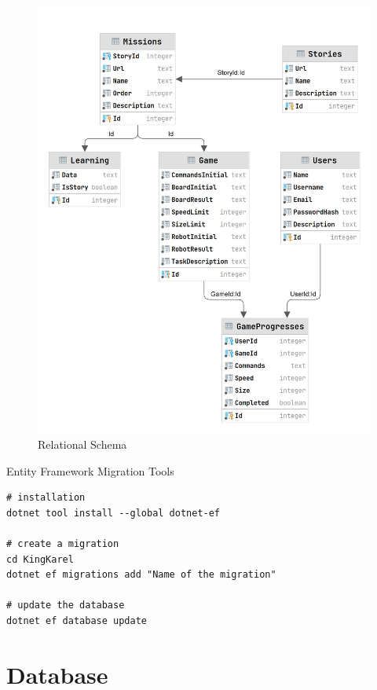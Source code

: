 \begin{figure}
    \centering
    \includegraphics[width=1\linewidth]{assets/implementation/erdiagram.png}
    \caption{Relational Schema}
    \label{fig:impementation:relationalschema}
\end{figure}

\begin{listing}
    \caption{Entity Framework Migration Tools}
    \label{listing:migration}
    \begin{verbatim}
# installation
dotnet tool install --global dotnet-ef

# create a migration
cd KingKarel
dotnet ef migrations add "Name of the migration"

# update the database
dotnet ef database update
    \end{verbatim}
\end{listing}

\section{Database}

